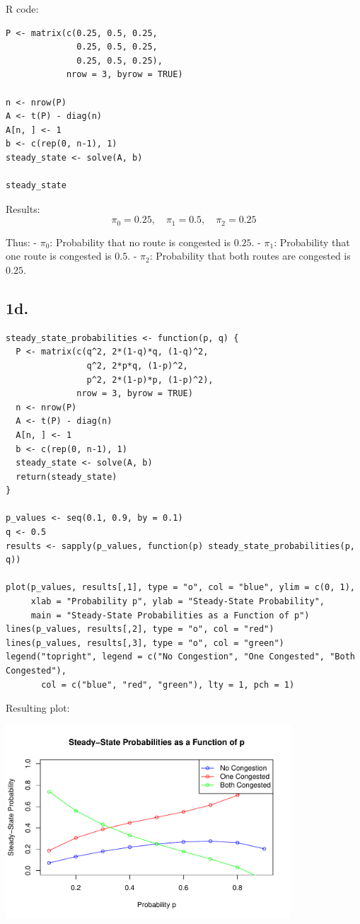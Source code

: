 \documentclass[12pt]{article}
\begin{document}
R code:

\begin{verbatim}
P <- matrix(c(0.25, 0.5, 0.25,
              0.25, 0.5, 0.25,
              0.25, 0.5, 0.25),
            nrow = 3, byrow = TRUE)

n <- nrow(P)
A <- t(P) - diag(n)  
A[n, ] <- 1         
b <- c(rep(0, n-1), 1)  
steady_state <- solve(A, b)

steady_state
\end{verbatim}

Results:
\[
\pi_0 = 0.25, \quad \pi_1 = 0.5, \quad \pi_2 = 0.25
\]

Thus: \newline
- \( \pi_0 \): Probability that no route is congested is \( 0.25 \). \newline
- \( \pi_1 \): Probability that one route is congested is \( 0.5 \). \newline
- \( \pi_2 \): Probability that both routes are congested is \( 0.25 \).

\subsection*{1d.}

\begin{verbatim}
steady_state_probabilities <- function(p, q) {
  P <- matrix(c(q^2, 2*(1-q)*q, (1-q)^2,
                q^2, 2*p*q, (1-p)^2,
                p^2, 2*(1-p)*p, (1-p)^2),
              nrow = 3, byrow = TRUE)
  n <- nrow(P)
  A <- t(P) - diag(n)  
  A[n, ] <- 1          
  b <- c(rep(0, n-1), 1)  
  steady_state <- solve(A, b)
  return(steady_state)
}

p_values <- seq(0.1, 0.9, by = 0.1)
q <- 0.5
results <- sapply(p_values, function(p) steady_state_probabilities(p, q))

plot(p_values, results[,1], type = "o", col = "blue", ylim = c(0, 1),
     xlab = "Probability p", ylab = "Steady-State Probability",
     main = "Steady-State Probabilities as a Function of p")
lines(p_values, results[,2], type = "o", col = "red")
lines(p_values, results[,3], type = "o", col = "green")
legend("topright", legend = c("No Congestion", "One Congested", "Both Congested"),
       col = c("blue", "red", "green"), lty = 1, pch = 1)
\end{verbatim}

Resulting plot:

\begin{center}
    \includegraphics[width=0.8\textwidth]{project2_1d.pdf}
\end{center}
\end{document}

